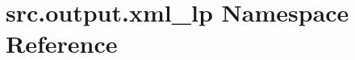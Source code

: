 \hypertarget{namespacesrc_1_1output_1_1xml__lp}{\section{src.\+output.\+xml\+\_\+lp Namespace Reference}
\label{namespacesrc_1_1output_1_1xml__lp}
}
